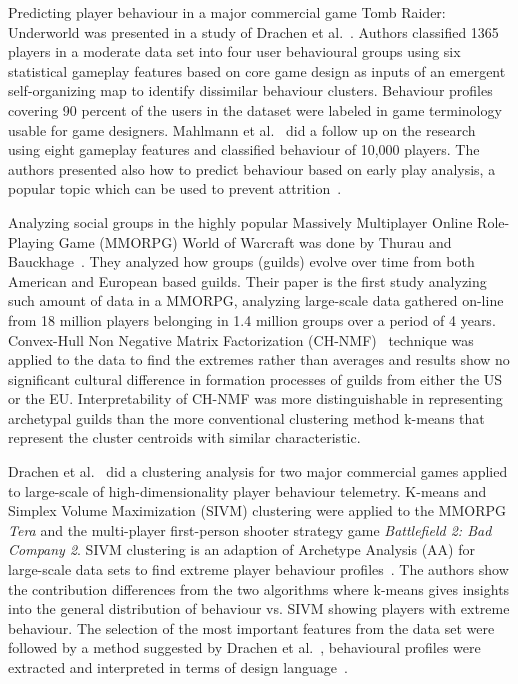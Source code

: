 Predicting player behaviour in a major commercial game Tomb Raider: Underworld was presented in a study of Drachen et al.~\citep{Drachen:2009Tomb}. Authors classified 1365 players in a moderate data set into four user behavioural groups using six statistical gameplay features based on core game design as inputs of an emergent self-organizing map to identify dissimilar behaviour clusters. Behaviour profiles covering 90 percent of the users in the dataset were labeled in game terminology usable for game designers. Mahlmann et al.~\citep{Mahlmann:2010Tomb} did a follow up on the research using eight gameplay features and classified behaviour of 10,000 players. The authors presented also how to predict behaviour based on early play analysis, a popular topic which can be used to prevent attrition~\citep{Fields:2011SocialGame}.

Analyzing social groups in the highly popular Massively Multiplayer Online Role-Playing Game (MMORPG) World of Warcraft was done by Thurau and Bauckhage~\citep{Thurau:2010WoW}. They analyzed how groups (guilds) evolve over time from both American and European based guilds. Their paper is the first study analyzing such amount of data in a MMORPG, analyzing large-scale data gathered on-line from 18 million players belonging in 1.4 million groups over a period of 4 years. Convex-Hull Non Negative Matrix Factorization (CH-NMF)~\citep{Thurau:2009SVIM} technique was applied to the data to find the extremes rather than averages and results show no significant cultural difference in formation processes of guilds from either the US or the EU. Interpretability of CH-NMF was more distinguishable in representing archetypal guilds than the more conventional clustering method k-means that represent the cluster centroids with similar characteristic.

Drachen et al.~\citep{Drachen:2012} did a clustering analysis for two major commercial games applied to large-scale of high-dimensionality player behaviour telemetry. K-means and Simplex Volume Maximization (SIVM) clustering were applied to the MMORPG \textit{Tera} and the multi-player first-person shooter strategy game \textit{Battlefield 2: Bad Company 2}. SIVM clustering is an adaption of Archetype Analysis (AA) for large-scale data sets to find extreme player behaviour profiles~\citep{Thurau:2009SVIM, Kersting:2010SVIM}. The authors show the contribution differences from the two algorithms where k-means gives insights into the general distribution of behaviour vs. SIVM showing players with extreme behaviour. The selection of the most important features from the data set were followed by a method suggested by Drachen et al.~\citep{Drachen:2009Tomb}, behavioural profiles were extracted and interpreted in terms of design language~\citep{Drachen:2009Tomb, Zoeller:2010}.


